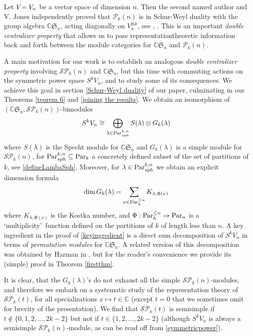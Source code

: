 \documentclass[10pt,hidelinks]{article}
\newcommand{\ParAlg}{{\mathcal P }_{k}}
\newcommand{\SpheAlg}{{\mathcal{SP} }_{k}}
\newcommand{\Par}{{\rm Par}   }
\newcommand{\ParSph}{  \Par_{sph}^{k, n}}
\newcommand{\CC}{ \mathbb C }
\newcommand{\Si}{\mathfrak{S}}
\numberwithin{equation}{section}
\begin{document}
\medskip
Let $ V {\color{black}{=V_n}} $ be a vector space of dimension $n$. 
Then the second named author and V. Jones
independently proved that $ \ParAlg(n)$ is in Schur-Weyl duality with the group algebra
$ \CC \Si_n $, acting 
diagonally on $ V_n^{\otimes k } $, see \cite{Jones}, \cite{PMartin}. 
This is an important {\it double centralizer property} that allows us to pass
representation{\color{black}{-}}theoretic information back and forth between the 
module categories for $ \CC \Si_n $ and $ \ParAlg(n)$. 

\medskip
A main motivation for our work is to establish an analogous
{\it double centralizer property} involving $ \SpheAlg(n) $ and $ \CC \Si_n $, but this time with
commuting actions 
on the symmetric power space $ S^k V_n $, and to study some of its consequences.
We achieve this goal in section \ref{Schur-Weyl duality}
of our paper, culminating in our Theorems \ref{teorem 6} and \ref{joining the results}. 
We obtain an isomorphism of $ (\CC \Si_n, \SpheAlg(n)) $-bimodules
\begin{equation}\label{symmetricpower}
S^k V_n \cong \bigoplus_{ \lambda \in  \ParSph} S(\lambda) \otimes G_k(\lambda) 
\end{equation}
where $ S(\lambda) $ is the Specht module for $ \CC \Si_n $ and $ G_k(\lambda)  $ is 
a simple module for $ \SpheAlg(n) $, 
for $ \ParSph \subseteq \Par_k $ 
a concretely defined subset of the set of partitions of $ k $, see \eqref{defineLambaSph}. 
Moreover, for $ \lambda \in \ParSph $
we obtain an explicit dimension formula
\begin{equation}\label{keyingredient}
 \dim G_k(\lambda) =
    \sum_{ \nu \in \Par_k^{\le n} } {  K_{\lambda,  \Phi(\nu)} }
\end{equation}
where $  K_{\lambda,  \Phi(\nu)} $ is the Kostka number, and $ \Phi:  \Par_k^{\le n} \rightarrow \Par_n $
is a \lq multiplicity\rq\ function defined on the partitions of $ k $ of length less than $ n $.
A key ingredient in the proof of \eqref{keyingredient} is a direct sum decomposition of $  S^k V_n $
in terms of {\it permutation modules} for $ \CC \Si_n $. A related version of this decomposition
was obtained by Harman in \cite{Harman}, 
but for the reader's convenience we provide its (simple) proof 
in Theorem \ref{firstthm}.

\medskip
It is clear, {\color{black}{however,}} that the $ G_k(\lambda) $'s do not exhaust
all the simple $ \SpheAlg(n)$-modules, 
and therefore we embark on 
a systematic study of the representation theory of $ \SpheAlg(t)$,
for all specializations $ x \mapsto t \in \CC $ (except $ t=0 $ that we sometimes omit for
brevity of the presentation). We find that
$ \SpheAlg(t)$ is semisimple if $ t \not\in \{0,1,2,\ldots, 2k-2 \} $
but not if $ t \in \{1,2,\ldots, 2k-2 \} $
(although 
$ S^k V_n $ is always a semisimple $ \SpheAlg(n)$-module, as can be read off from 
\eqref{symmetricpower}). 
\end{document}
